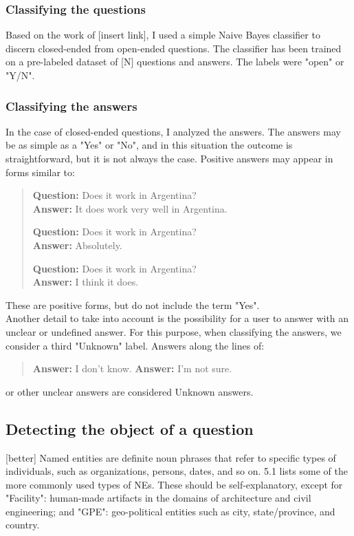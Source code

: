 \documentclass[LaM,binding=0.6cm]{sapthesis}
\begin{document}
\subsubsection{Classifying the questions}
Based on the work of [insert link], I used a simple Naive Bayes classifier to discern closed-ended from open-ended questions.
The classifier has been trained on a pre-labeled dataset of [N] questions and answers. The labels were "open" or "Y/N".

\subsubsection{Classifying the answers}
In the case of closed-ended questions, I analyzed the answers.
The answers may be as simple as a "Yes" or "No", and in this situation the outcome is straightforward, but it is not always the case.
Positive answers may appear in forms similar to:
\begin{quote}
\textbf{Question:} Does it work in Argentina? \\
\textbf{Answer:} It does work very well in Argentina.

\textbf{Question:} Does it work in Argentina? \\
\textbf{Answer:} Absolutely.

\textbf{Question:} Does it work in Argentina? \\
\textbf{Answer:} I think it does.
\end{quote}
These are positive forms, but do not include the term "Yes". \\

Another detail to take into account is the possibility for a user to answer with an unclear or undefined answer. For this purpose, when classifying the answers, we consider a third "Unknown" label.
Answers along the lines of:

\begin{quote}
\textbf{Answer:} I don't know.
\textbf{Answer:} I'm not sure.
\end{quote}

or other unclear answers are considered Unknown answers.

\subsection{Detecting the object of a question}
[better]
Named entities are definite noun phrases that refer to specific types of individuals, such as organizations, persons, dates, and so on. 5.1 lists some of the more commonly used types of NEs. These should be self-explanatory, except for "Facility": human-made artifacts in the domains of architecture and civil engineering; and "GPE": geo-political entities such as city, state/province, and country.
\end{document}
